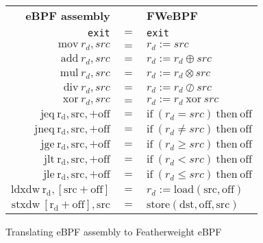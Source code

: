 \begin{figure}[H]
  \centering
  \begin{tabular}{rcl}
    \textbf{eBPF assembly} & & \textbf{FWeBPF} \\
    \texttt{exit} & $=$ & \texttt{exit} \\
    $\mathrm{mov} ~ r_d, src$ & $=$ & $r_d := src$ \\
    $\mathrm{add} ~ r_d, src$ & $=$ & $r_d := r_d \oplus src$ \\
    $\mathrm{mul} ~ r_d, src$ & $=$ & $r_d := r_d \otimes src$ \\        
    $\mathrm{div} ~ r_d, src$ & $=$ & $r_d := r_d \oslash src$ \\
    $\mathrm{xor} ~ r_d, src$ & $=$ & $r_d := r_d ~ \mathrm{xor} ~ src$ \\            
    $\mathrm{jeq ~ r_d, src, +off}$ & $=$ & $\mathrm{if} ~ (r_d = src) ~ \mathrm{then} ~ \mathrm{off}$ \\
    $\mathrm{jneq ~ r_d, src, +off}$ & $=$ & $\mathrm{if} ~ (r_d \neq src) ~ \mathrm{then} ~ \mathrm{off}$ \\
    $\mathrm{jge ~ r_d, src, +off}$ & $=$ & $\mathrm{if} ~ (r_d \geq src) ~ \mathrm{then} ~ \mathrm{off}$    \\
    $\mathrm{jlt ~ r_d, src, +off}$ & $=$ & $\mathrm{if} ~ (r_d < src) ~ \mathrm{then} ~ \mathrm{off}$    \\
    $\mathrm{jle ~ r_d, src, +off}$ & $=$ & $\mathrm{if} ~ (r_d \leq src) ~ \mathrm{then} ~ \mathrm{off}$    \\    
    $\mathrm{ldxdw ~ r_d, [src + \mathrm{off}]}$ & $=$ & $r_d := \mathrm{load(src, off)}$ \\
    $\mathrm{stxdw ~ [r_d + off], src}$ & $=$ & $\mathrm{store(dst, off, src)}$ \\    
  \end{tabular}
  \caption{Translating eBPF assembly to Featherweight eBPF}
\label{fig:translation}
\end{figure}

